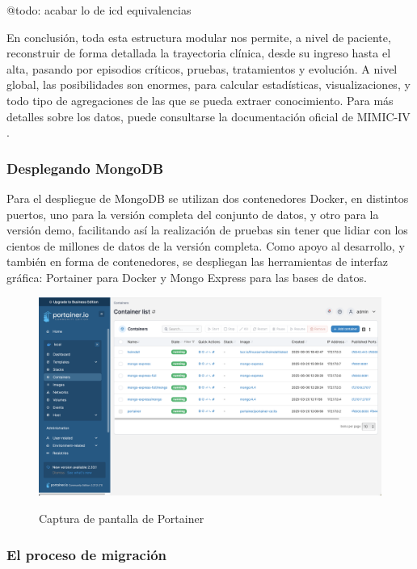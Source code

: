 @todo: acabar lo de icd equivalencias

En conclusión, toda esta estructura modular nos permite, a nivel de paciente, reconstruir de forma detallada la trayectoria clínica, desde su ingreso hasta el alta, pasando por episodios críticos, pruebas, tratamientos y evolución. A nivel global, las posibilidades son enormes, para calcular estadísticas, visualizaciones, y todo tipo de agregaciones de las que se pueda extraer conocimiento. Para más detalles sobre los datos, puede consultarse la documentación oficial de MIMIC-IV \cite{MIMICIV_docs}.

\subsubsection{Desplegando MongoDB}

Para el despliegue de MongoDB se utilizan dos contenedores Docker, en distintos puertos, uno para la versión completa del conjunto de datos, y otro para la versión demo, facilitando así la realización de pruebas sin tener que lidiar con los cientos de millones de datos de la versión completa. Como apoyo al desarrollo, y también en forma de contenedores, se despliegan las herramientas de interfaz gráfica: Portainer para Docker\cite{portainer_ce} y Mongo Express para las bases de datos\cite{mongo_express}. 


\begin{figure}[H]
  \centering
  {\includegraphics[width=1\textwidth]{imagenes/screenshot3.png}}
  \caption{Captura de pantalla de Portainer}
  \label{fig:screenshot3}
\end{figure}


\subsubsection{El proceso de migración}

